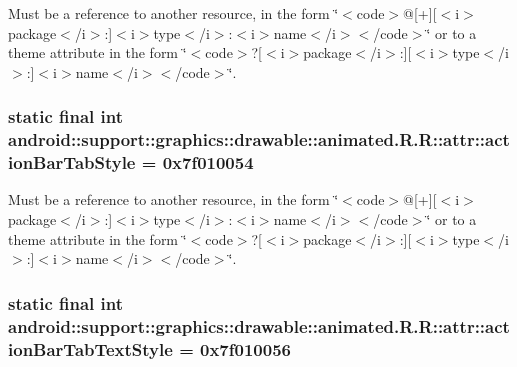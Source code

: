Must be a reference to another resource, in the form \char`\"{}$<$code$>$@\mbox{[}+\mbox{]}\mbox{[}$<$i$>$package$<$/i$>$:\mbox{]}$<$i$>$type$<$/i$>$:$<$i$>$name$<$/i$>$$<$/code$>$\char`\"{} or to a theme attribute in the form \char`\"{}$<$code$>$?\mbox{[}$<$i$>$package$<$/i$>$:\mbox{]}\mbox{[}$<$i$>$type$<$/i$>$:\mbox{]}$<$i$>$name$<$/i$>$$<$/code$>$\char`\"{}. \hypertarget{classandroid_1_1support_1_1graphics_1_1drawable_1_1animated_1_1_r_1_1attr_a7d6c7306ca0951c4e0f9bad250b04d8}{
\subsubsection[{actionBarTabStyle}]{\setlength{\rightskip}{0pt plus 5cm}static final int android::support::graphics::drawable::animated.R.R::attr::actionBarTabStyle = 0x7f010054}}
\label{classandroid_1_1support_1_1graphics_1_1drawable_1_1animated_1_1_r_1_1attr_a7d6c7306ca0951c4e0f9bad250b04d8}


Must be a reference to another resource, in the form \char`\"{}$<$code$>$@\mbox{[}+\mbox{]}\mbox{[}$<$i$>$package$<$/i$>$:\mbox{]}$<$i$>$type$<$/i$>$:$<$i$>$name$<$/i$>$$<$/code$>$\char`\"{} or to a theme attribute in the form \char`\"{}$<$code$>$?\mbox{[}$<$i$>$package$<$/i$>$:\mbox{]}\mbox{[}$<$i$>$type$<$/i$>$:\mbox{]}$<$i$>$name$<$/i$>$$<$/code$>$\char`\"{}. \hypertarget{classandroid_1_1support_1_1graphics_1_1drawable_1_1animated_1_1_r_1_1attr_24f4b433ff51aa72a4b6deec7fee9b42}{
\subsubsection[{actionBarTabTextStyle}]{\setlength{\rightskip}{0pt plus 5cm}static final int android::support::graphics::drawable::animated.R.R::attr::actionBarTabTextStyle = 0x7f010056}}
\label{classandroid_1_1support_1_1graphics_1_1drawable_1_1animated_1_1_r_1_1attr_24f4b433ff51aa72a4b6deec7fee9b42}


